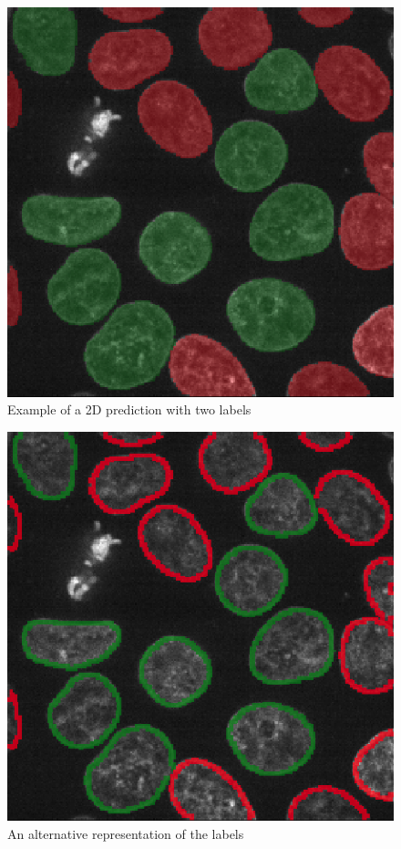 \documentclass{article}
\begin{document}
\begin{figure}[htp!]{}
 \centering
 \includegraphics[scale=0.15]{Figures/resultat.png}
  \caption{Example of a 2D prediction with two labels}
  \label{predict}

\end{figure}


\begin{figure}[h!]{}
 \centering
 \includegraphics[scale=0.15]{Figures/resultat_contour.png}
  \caption{An alternative representation of the labels}
  \label{predict_contours}

\end{figure}
\end{document}
